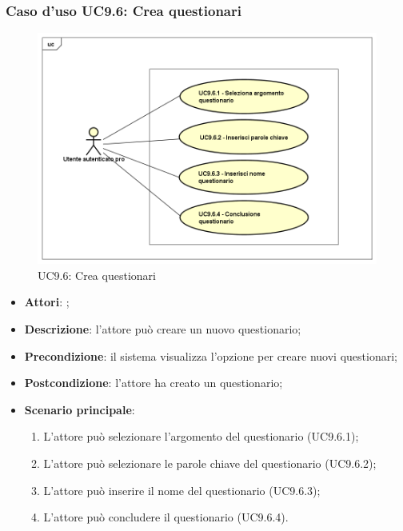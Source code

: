 	\subsubsection{Caso d'uso UC9.6: Crea questionari}
	\label{UC9.6}
	\begin{figure}[h]
		\centering
	\includegraphics[scale=0.5,keepaspectratio]{UML/UC9_6.png}
		\caption{UC9.6: Crea questionari}
	\end{figure}
	\FloatBarrier
	\begin{itemize}
		\item \textbf{Attori}: \uaupro{};
		\item \textbf{Descrizione}: l'attore può creare un nuovo questionario; 
		\item \textbf{Precondizione}: il sistema visualizza l'opzione per creare nuovi questionari;
		\item \textbf{Postcondizione}: l'attore ha creato un questionario;
		\item \textbf{Scenario principale}:
			\begin{enumerate}
				\item L'attore può selezionare l'argomento del questionario (UC9.6.1);
				\item L'attore può selezionare le parole chiave del questionario (UC9.6.2);
				\item L'attore può inserire il nome del questionario (UC9.6.3);
				\item L'attore può concludere il questionario (UC9.6.4).
			\end{enumerate}
	\end{itemize}
	
